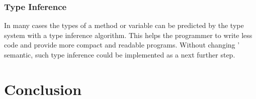 \subsubsection{Type Inference}
In many cases the types of a method or variable can be predicted
by the type system with a type inference algorithm. This helps
the programmer to write less code and provide more compact and readable
programs. Without changing \ooplss' semantic, such type inference
could be implemented as a next further step.

\section{Conclusion}
\label{ctr:conclusion}
